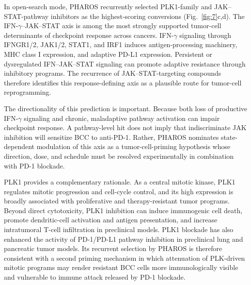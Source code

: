 \documentclass[11pt,a4paper]{article}
\begin{document}
In open-search mode, PHAROS recurrently selected PLK1-family and JAK--STAT-pathway inhibitors as the highest-scoring conversions (Fig.~\ref{fig:7}c,d). The IFN-$\gamma$--JAK--STAT axis is among the most strongly supported tumor-cell determinants of checkpoint response across cancers. IFN-$\gamma$ signaling through IFNGR1/2, JAK1/2, STAT1, and IRF1 induces antigen-processing machinery, MHC class I expression, and adaptive PD-L1 expression. Persistent or dysregulated IFN--JAK--STAT signaling can promote adaptive resistance through inhibitory programs\cite{Wong2023,Zaretsky2016,Qiu2023,Benci2016,Ivashkiv2018,Kalbasi2019}. The recurrence of JAK--STAT-targeting compounds therefore identifies this response-defining axis as a plausible route for tumor-cell reprogramming.

The directionality of this prediction is important. Because both loss of productive IFN-$\gamma$ signaling and chronic, maladaptive pathway activation can impair checkpoint response\cite{Luo2018,Liu2026,Arias-Badia2025,Benci2016,Kalbasi2019}. A pathway-level hit does not imply that indiscriminate JAK inhibition will sensitize BCC to anti-PD-1. Rather, PHAROS nominates state-dependent modulation of this axis as a tumor-cell-priming hypothesis whose direction, dose, and schedule must be resolved experimentally in combination with PD-1 blockade.

PLK1 provides a complementary rationale. As a central mitotic kinase, PLK1 regulates mitotic progression and cell-cycle control, and its high expression is broadly associated with proliferative and therapy-resistant tumor programs\cite{Wang2025plk,Chiappa2022,Li2018,Su2022}. Beyond direct cytotoxicity, PLK1 inhibition can induce immunogenic cell death, promote dendritic-cell activation and antigen presentation, and increase intratumoral T-cell infiltration in preclinical models\cite{Zhou2021}. PLK1 blockade has also enhanced the activity of PD-1/PD-L1 pathway inhibition in preclinical lung and pancreatic tumor models\cite{Zhang2022plk,Reda2022}. Its recurrent selection by PHAROS is therefore consistent with a second priming mechanism in which attenuation of PLK-driven mitotic programs may render resistant BCC cells more immunologically visible and vulnerable to immune attack released by PD-1 blockade.
\end{document}
